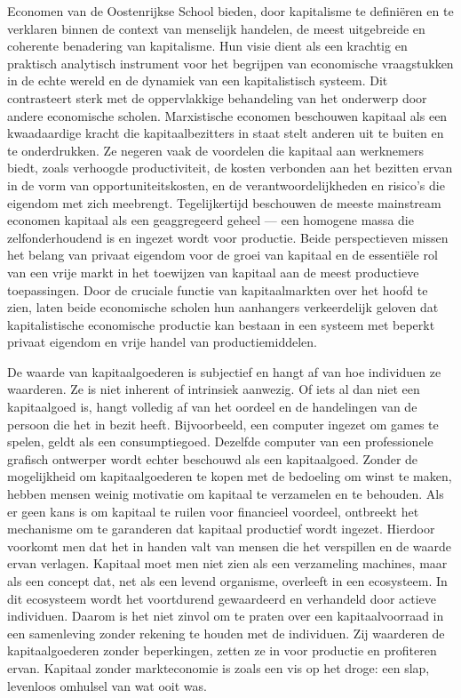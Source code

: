 \documentclass[
  a5paper,
  smalldemyvopaper,11pt,twoside,onecolumn,openright,extrafontsizes,
hidelinks]{memoir}
\begin{document}
Economen van de Oostenrijkse School bieden, door kapitalisme te
definiëren en te verklaren binnen de context van menselijk handelen, de
meest uitgebreide en coherente benadering van kapitalisme. Hun visie
dient als een krachtig en praktisch analytisch instrument voor het
begrijpen van economische vraagstukken in de echte wereld en de dynamiek
van een kapitalistisch systeem. Dit contrasteert sterk met de
oppervlakkige behandeling van het onderwerp door andere economische
scholen. Marxistische economen beschouwen kapitaal als een kwaadaardige
kracht die kapitaalbezitters in staat stelt anderen uit te buiten en te
onderdrukken. Ze negeren vaak de voordelen die kapitaal aan werknemers
biedt, zoals verhoogde productiviteit, de kosten verbonden aan het
bezitten ervan in de vorm van opportuniteitskosten, en de
verantwoordelijkheden en risico's die eigendom met zich meebrengt.
Tegelijkertijd beschouwen de meeste mainstream economen kapitaal als een
geaggregeerd geheel --- een homogene massa die zelfonderhoudend is en
ingezet wordt voor productie. Beide perspectieven missen het belang van
privaat eigendom voor de groei van kapitaal en de essentiële rol van een
vrije markt in het toewijzen van kapitaal aan de meest productieve
toepassingen. Door de cruciale functie van kapitaalmarkten over het
hoofd te zien, laten beide economische scholen hun aanhangers
verkeerdelijk geloven dat kapitalistische economische productie kan
bestaan in een systeem met beperkt privaat eigendom en vrije handel van
productiemiddelen.

De waarde van kapitaalgoederen is subjectief en hangt af van hoe
individuen ze waarderen. Ze is niet inherent of intrinsiek aanwezig. Of
iets al dan niet een kapitaalgoed is, hangt volledig af van het oordeel
en de handelingen van de persoon die het in bezit heeft. Bijvoorbeeld,
een computer ingezet om games te spelen, geldt als een consumptiegoed.
Dezelfde computer van een professionele grafisch ontwerper wordt echter
beschouwd als een kapitaalgoed. Zonder de mogelijkheid om
kapitaalgoederen te kopen met de bedoeling om winst te maken, hebben
mensen weinig motivatie om kapitaal te verzamelen en te behouden. Als er
geen kans is om kapitaal te ruilen voor financieel voordeel, ontbreekt
het mechanisme om te garanderen dat kapitaal productief wordt ingezet.
Hierdoor voorkomt men dat het in handen valt van mensen die het
verspillen en de waarde ervan verlagen. Kapitaal moet men niet zien als
een verzameling machines, maar als een concept dat, net als een levend
organisme, overleeft in een ecosysteem. In dit ecosysteem wordt het
voortdurend gewaardeerd en verhandeld door actieve individuen. Daarom is
het niet zinvol om te praten over een kapitaalvoorraad in een
samenleving zonder rekening te houden met de individuen. Zij waarderen
de kapitaalgoederen zonder beperkingen, zetten ze in voor productie en
profiteren ervan. Kapitaal zonder markteconomie is zoals een vis op het
droge: een slap, levenloos omhulsel van wat ooit was.
\end{document}

